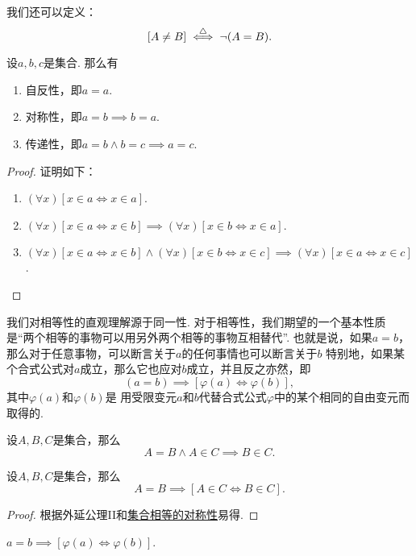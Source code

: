 我们还可以定义：\[
	[A \neq B] \overset{\triangle}{\iff} \neg(A=B).
\]

\begin{property}
设\(a,b,c\)是集合.
那么有\begin{enumerate}
	\item\label{item:集合论.集合相等的自反性}
	自反性，即\(a=a\).
	\item\label{item:集合论.集合相等的对称性}
	对称性，即\(a=b \implies b=a\).
	\item\label{item:集合论.集合相等的传递性}
	传递性，即\(a=b \land b=c \implies a=c\).
\end{enumerate}
\begin{proof}
证明如下：
\begin{enumerate}
	\item \((\forall x)[x \in a \iff x \in a]\).
	\item \((\forall x)[x \in a \iff x \in b] \implies (\forall x)[x \in b \iff x \in a]\).
	\item \((\forall x)[x \in a \iff x \in b] \land (\forall x)[x \in b \iff x \in c]
	\implies (\forall x)[x \in a \iff x \in c]\).
	\qedhere
\end{enumerate}
\end{proof}
\end{property}

我们对相等性的直观理解源于同一性.
对于相等性，我们期望的一个基本性质是“两个相等的事物可以用另外两个相等的事物互相替代”.
也就是说，如果\(a=b\)，那么对于任意事物，可以断言关于\(a\)的任何事情也可以断言关于\(b\)
特别地，如果某个合式公式对\(a\)成立，那么它也应对\(b\)成立，并且反之亦然，即\[
	(a=b)\implies[\varphi(a)\iff\varphi(b)],
\]
其中\(\varphi(a)\)和\(\varphi(b)\)是%
用受限变元\(a\)和\(b\)代替合式公式\(\varphi\)中的某个相同的自由变元而取得的.

\begin{axiom}[外延公理II]
设\(A,B,C\)是集合，那么\[
	A=B \land A \in C \implies B \in C.
\]
\end{axiom}

\begin{property}
设\(A,B,C\)是集合，那么\[
	A=B \implies [A \in C \iff B \in C].
\]
\begin{proof}
根据外延公理II和\hyperref[item:集合论.集合相等的对称性]{集合相等的对称性}易得.
\end{proof}
\end{property}

\begin{theorem}
\(a=b \implies [\varphi(a)\iff\varphi(b)]\).
\end{theorem}

